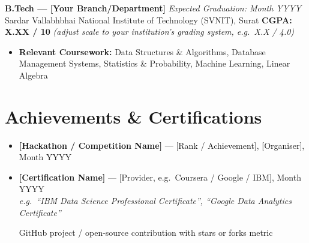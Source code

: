 \documentclass[10pt, letterpaper]{article}
\begin{document}
\textbf{B.Tech --- [Your Branch/Department]} \hfill \textit{Expected Graduation: Month YYYY}\\
Sardar Vallabhbhai National Institute of Technology (SVNIT), Surat
\quad \textbf{CGPA: X.XX / 10}
{\small\textit{(adjust scale to your institution's grading system, e.g.\ X.X / 4.0)}}

\begin{itemize}
  \item \textbf{Relevant Coursework:} Data Structures \& Algorithms,
        Database Management Systems, Statistics \& Probability,
        Machine Learning, Linear Algebra
\end{itemize}

\section{Achievements \& Certifications}

\begin{itemize}
  \item \textbf{[Hackathon / Competition Name]} --- [Rank / Achievement], [Organiser], Month YYYY
  \item \textbf{[Certification Name]} --- [Provider, e.g.\ Coursera / Google / IBM], Month YYYY\\
        {\small\textit{e.g.\ ``IBM Data Science Professional Certificate'',
        ``Google Data Analytics Certificate''}}
  \item [GitHub project / open-source contribution with stars or forks metric]
\end{itemize}
\end{document}
